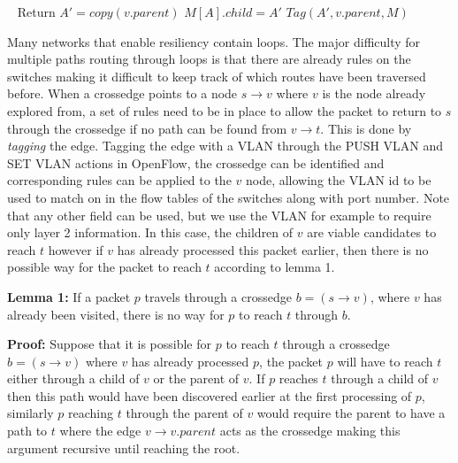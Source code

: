 \begin{algorithm}
\begin{algorithmic}[1]

    \State \
    \State Return
    \Else
    \State $A'=copy(v.parent)$
    \State $M[A].child=A'$
    \State $Tag(A',v.parent,M)$ 
    \EndIf

    \EndFunction
  \end{algorithmic}
\end{algorithm}

Many networks that enable resiliency contain loops.
The major difficulty for multiple paths routing through loops is that there are already rules on the switches making it difficult to keep track of which routes have been traversed before.
When a crossedge points to a node $s \to v$ where $v$ is the node already explored from, a set of rules need to be in place to allow the packet to return to $s$ through the crossedge if no path can be found from $v \to t$. This is done by \textit{tagging} the edge.
Tagging the edge with a VLAN through the PUSH VLAN and SET VLAN actions in OpenFlow, the crossedge can be identified and corresponding rules can be applied to the $v$ node, allowing the VLAN id to be used to match on in the flow tables of the switches along with port number. Note that any other field can be used, but we use the VLAN for example to require only layer 2 information. In this case, the children of $v$ are viable candidates to reach $t$ however if $v$ has already processed this packet earlier, then there is no possible way for the packet to reach $t$ according to lemma 1.

\textbf{Lemma 1: } If a packet $p$ travels through a crossedge $b= (s \to v)$, where $v$ has already been visited, there is no way for $p$ to reach $t$ through $b$.

\textbf{Proof: } Suppose that it is possible for $p$ to reach $t$ through a crossedge $b=(s \to v)$ where $v$ has already processed $p$, the packet $p$ will have to reach $t$ either through a child of $v$ or the parent of $v$.
If $p$ reaches $t$ through a child of $v$ then this path would have been discovered earlier at the first processing of $p$, similarly $p$ reaching $t$ through the parent of $v$ would require the parent to have a path to $t$ where the edge $v \to v.parent$ acts as the crossedge making this argument recursive until reaching the root.

